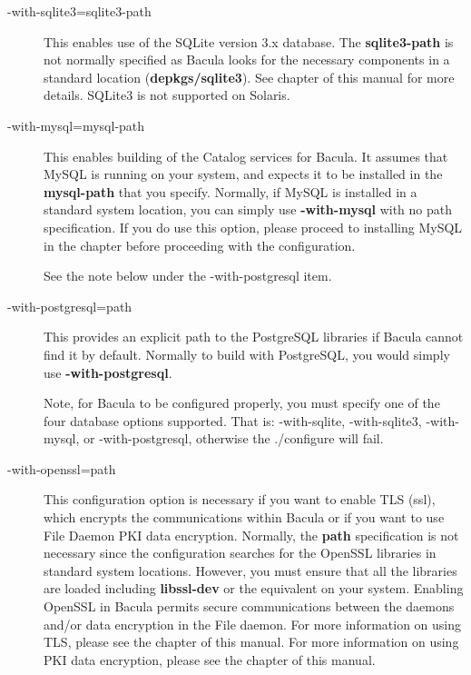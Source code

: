 \begin{description}
\item [ {-}{\-}with-sqlite3=\lt{}sqlite3-path\gt{}]
   This enables use of the SQLite version 3.x database.  The {\bf
   sqlite3-path} is not normally specified as Bacula looks for the
   necessary components in a standard location ({\bf depkgs/sqlite3}).  See
    chapter of
   this manual for more details. SQLite3 is not supported on Solaris.

\item [ {-}{\-}with-mysql=\lt{}mysql-path\gt{}]
   This enables building of the Catalog services for Bacula.  It assumes
   that MySQL is running on your system, and expects it to be installed in
   the {\bf mysql-path} that you specify.  Normally, if MySQL is installed
   in a standard system location, you can simply use {\bf {-}{\-}with-mysql}
   with no path specification.  If you do use this option, please proceed
   to installing MySQL in the  chapter before proceeding with the configuration.

   See the note below under the {-}{\-}with-postgresql item.

\item [ {-}{\-}with-postgresql=\lt{}path\gt{}]
   This provides an explicit path to the PostgreSQL libraries if Bacula
   cannot find it by default.  Normally to build with PostgreSQL, you would
   simply use {\bf {-}{\-}with-postgresql}.

   Note, for Bacula to be configured properly, you must specify one
   of the four database options supported.  That is:
   {-}{\-}with-sqlite, {-}{\-}with-sqlite3, {-}{\-}with-mysql, or
   {-}{\-}with-postgresql, otherwise the ./configure will fail.

\item [ {-}{\-}with-openssl=\lt{}path\gt{}]
   This configuration option is necessary if you want to enable TLS (ssl),
   which encrypts the communications within       
   Bacula or if you want to use File Daemon PKI data encryption.
   Normally, the {\bf path} specification is not necessary since
   the configuration searches for the OpenSSL libraries in standard system
   locations. However, you must ensure that all the libraries are
   loaded including {\bf libssl-dev} or the equivalent on your
   system. Enabling OpenSSL in Bacula permits secure communications
   between the daemons and/or data encryption in the File daemon.
   For more information on using TLS, please see the
    chapter
   of this manual.
   For more information on using PKI data encryption, please see the
   chapter of this manual.
              

\end{description}
